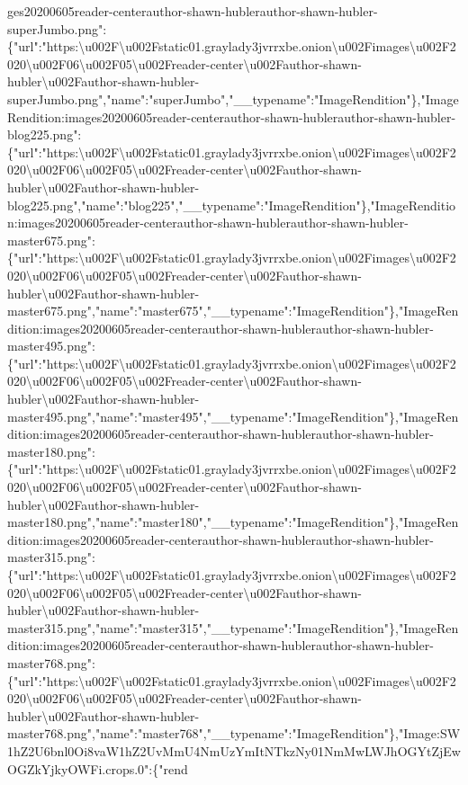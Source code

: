 ges20200605reader-centerauthor-shawn-hublerauthor-shawn-hubler-superJumbo.png":\{"url":"https:\textbackslash{}u002F\textbackslash{}u002Fstatic01.graylady3jvrrxbe.onion\textbackslash{}u002Fimages\textbackslash{}u002F2020\textbackslash{}u002F06\textbackslash{}u002F05\textbackslash{}u002Freader-center\textbackslash{}u002Fauthor-shawn-hubler\textbackslash{}u002Fauthor-shawn-hubler-superJumbo.png","name":"superJumbo","\_\_typename":"ImageRendition"\},"ImageRendition:images20200605reader-centerauthor-shawn-hublerauthor-shawn-hubler-blog225.png":\{"url":"https:\textbackslash{}u002F\textbackslash{}u002Fstatic01.graylady3jvrrxbe.onion\textbackslash{}u002Fimages\textbackslash{}u002F2020\textbackslash{}u002F06\textbackslash{}u002F05\textbackslash{}u002Freader-center\textbackslash{}u002Fauthor-shawn-hubler\textbackslash{}u002Fauthor-shawn-hubler-blog225.png","name":"blog225","\_\_typename":"ImageRendition"\},"ImageRendition:images20200605reader-centerauthor-shawn-hublerauthor-shawn-hubler-master675.png":\{"url":"https:\textbackslash{}u002F\textbackslash{}u002Fstatic01.graylady3jvrrxbe.onion\textbackslash{}u002Fimages\textbackslash{}u002F2020\textbackslash{}u002F06\textbackslash{}u002F05\textbackslash{}u002Freader-center\textbackslash{}u002Fauthor-shawn-hubler\textbackslash{}u002Fauthor-shawn-hubler-master675.png","name":"master675","\_\_typename":"ImageRendition"\},"ImageRendition:images20200605reader-centerauthor-shawn-hublerauthor-shawn-hubler-master495.png":\{"url":"https:\textbackslash{}u002F\textbackslash{}u002Fstatic01.graylady3jvrrxbe.onion\textbackslash{}u002Fimages\textbackslash{}u002F2020\textbackslash{}u002F06\textbackslash{}u002F05\textbackslash{}u002Freader-center\textbackslash{}u002Fauthor-shawn-hubler\textbackslash{}u002Fauthor-shawn-hubler-master495.png","name":"master495","\_\_typename":"ImageRendition"\},"ImageRendition:images20200605reader-centerauthor-shawn-hublerauthor-shawn-hubler-master180.png":\{"url":"https:\textbackslash{}u002F\textbackslash{}u002Fstatic01.graylady3jvrrxbe.onion\textbackslash{}u002Fimages\textbackslash{}u002F2020\textbackslash{}u002F06\textbackslash{}u002F05\textbackslash{}u002Freader-center\textbackslash{}u002Fauthor-shawn-hubler\textbackslash{}u002Fauthor-shawn-hubler-master180.png","name":"master180","\_\_typename":"ImageRendition"\},"ImageRendition:images20200605reader-centerauthor-shawn-hublerauthor-shawn-hubler-master315.png":\{"url":"https:\textbackslash{}u002F\textbackslash{}u002Fstatic01.graylady3jvrrxbe.onion\textbackslash{}u002Fimages\textbackslash{}u002F2020\textbackslash{}u002F06\textbackslash{}u002F05\textbackslash{}u002Freader-center\textbackslash{}u002Fauthor-shawn-hubler\textbackslash{}u002Fauthor-shawn-hubler-master315.png","name":"master315","\_\_typename":"ImageRendition"\},"ImageRendition:images20200605reader-centerauthor-shawn-hublerauthor-shawn-hubler-master768.png":\{"url":"https:\textbackslash{}u002F\textbackslash{}u002Fstatic01.graylady3jvrrxbe.onion\textbackslash{}u002Fimages\textbackslash{}u002F2020\textbackslash{}u002F06\textbackslash{}u002F05\textbackslash{}u002Freader-center\textbackslash{}u002Fauthor-shawn-hubler\textbackslash{}u002Fauthor-shawn-hubler-master768.png","name":"master768","\_\_typename":"ImageRendition"\},"Image:SW1hZ2U6bnl0Oi8vaW1hZ2UvMmU4NmUzYmItNTkzNy01NmMwLWJhOGYtZjEwOGZkYjkyOWFi.crops.0":\{"rend